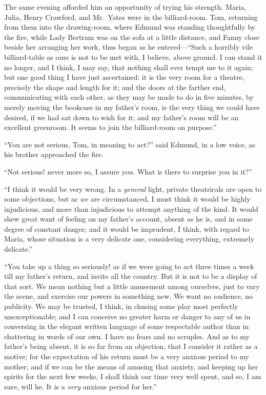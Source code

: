 \documentclass{article}
\begin{document}
The same evening afforded him an opportunity of trying
his strength.  Maria, Julia, Henry Crawford, and Mr.\ Yates
were in the billiard-room. Tom, returning from them into
the drawing-room, where Edmund was standing thoughtfully
by the fire, while Lady Bertram was on the sofa at a
little distance, and Fanny close beside her arranging
her work, thus began as he entered---``Such a horribly vile
billiard-table as ours is not to be met with, I believe,
above ground.  I can stand it no longer, and I think,
I may say, that nothing shall ever tempt me to it again;
but one good thing I have just ascertained:  it is the very
room for a theatre, precisely the shape and length for it;
and the doors at the farther end, communicating with each other,
as they may be made to do in five minutes, by merely moving
the bookcase in my father's room, is the very thing we
could have desired, if we had sat down to wish for it;
and my father's room will be an excellent greenroom.
It seems to join the billiard-room on purpose.''

``You are not serious, Tom, in meaning to act?'' said Edmund,
in a low voice, as his brother approached the fire.

``Not serious! never more so, I assure you.  What is there
to surprise you in it?''

``I think it would be very wrong.  In a \emph{general} light,
private theatricals are open to some objections, but as \emph{we}
are circumstanced, I must think it would be highly injudicious,
and more than injudicious to attempt anything of the kind.
It would shew great want of feeling on my father's account,
absent as he is, and in some degree of constant danger;
and it would be imprudent, I think, with regard to Maria,
whose situation is a very delicate one, considering everything,
extremely delicate.''

``You take up a thing so seriously! as if we were going
to act three times a week till my father's return,
and invite all the country.  But it is not to be a
display of that sort.  We mean nothing but a little
amusement among ourselves, just to vary the scene,
and exercise our powers in something new.  We want
no audience, no publicity.  We may be trusted, I think,
in chusing some play most perfectly unexceptionable;
and I can conceive no greater harm or danger to any of us
in conversing in the elegant written language of some
respectable author than in chattering in words of our own.
I have no fears and no scruples.  And as to my father's
being absent, it is so far from an objection, that I
consider it rather as a motive; for the expectation
of his return must be a very anxious period to my mother;
and if we can be the means of amusing that anxiety,
and keeping up her spirits for the next few weeks, I shall
think our time very well spent, and so, I am sure, will he.
It is a \emph{very} anxious period for her.''
\end{document}
